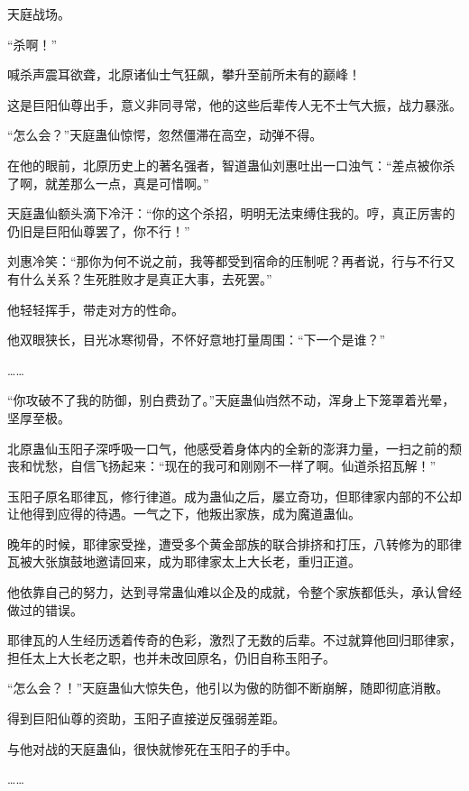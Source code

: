 
\begin{this_body}



天庭战场。

“杀啊！”

喊杀声震耳欲聋，北原诸仙士气狂飙，攀升至前所未有的巅峰！

这是巨阳仙尊出手，意义非同寻常，他的这些后辈传人无不士气大振，战力暴涨。

“怎么会？”天庭蛊仙惊愕，忽然僵滞在高空，动弹不得。

在他的眼前，北原历史上的著名强者，智道蛊仙刘惠吐出一口浊气：“差点被你杀了啊，就差那么一点，真是可惜啊。”

天庭蛊仙额头滴下冷汗：“你的这个杀招，明明无法束缚住我的。哼，真正厉害的仍旧是巨阳仙尊罢了，你不行！”

刘惠冷笑：“那你为何不说之前，我等都受到宿命的压制呢？再者说，行与不行又有什么关系？生死胜败才是真正大事，去死罢。”

他轻轻挥手，带走对方的性命。

他双眼狭长，目光冰寒彻骨，不怀好意地打量周围：“下一个是谁？”

……

“你攻破不了我的防御，别白费劲了。”天庭蛊仙岿然不动，浑身上下笼罩着光晕，坚厚至极。

北原蛊仙玉阳子深呼吸一口气，他感受着身体内的全新的澎湃力量，一扫之前的颓丧和忧愁，自信飞扬起来：“现在的我可和刚刚不一样了啊。仙道杀招瓦解！”

玉阳子原名耶律瓦，修行律道。成为蛊仙之后，屡立奇功，但耶律家内部的不公却让他得到应得的待遇。一气之下，他叛出家族，成为魔道蛊仙。

晚年的时候，耶律家受挫，遭受多个黄金部族的联合排挤和打压，八转修为的耶律瓦被大张旗鼓地邀请回来，成为耶律家太上大长老，重归正道。

他依靠自己的努力，达到寻常蛊仙难以企及的成就，令整个家族都低头，承认曾经做过的错误。

耶律瓦的人生经历透着传奇的色彩，激烈了无数的后辈。不过就算他回归耶律家，担任太上大长老之职，也并未改回原名，仍旧自称玉阳子。

“怎么会？！”天庭蛊仙大惊失色，他引以为傲的防御不断崩解，随即彻底消散。

得到巨阳仙尊的资助，玉阳子直接逆反强弱差距。

与他对战的天庭蛊仙，很快就惨死在玉阳子的手中。

……


\end{this_body}
